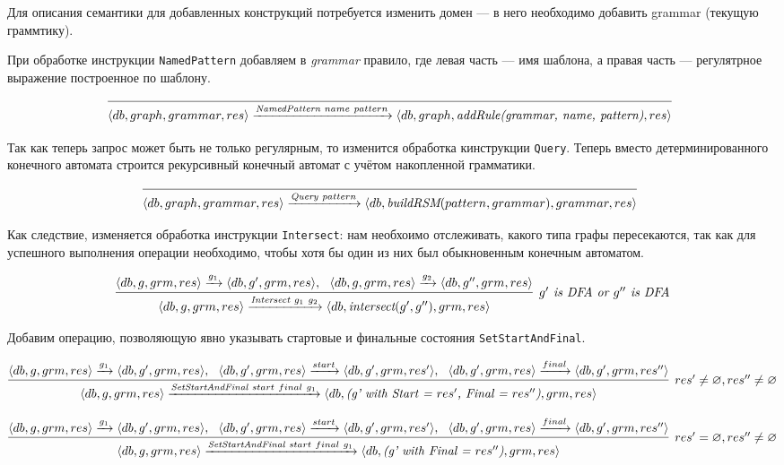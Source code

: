 Для описания семантики для добавленных конструкций потребуется изменить домен --- в него необходимо добавить grammar (текущую граммтику).


При обработке инструкции \verb|NamedPattern| добавляем в \textit{grammar} правило, где левая часть --- имя шаблона, а правая часть --- регулятрное выражение построенное по шаблону.

$$
\infer[]{\langle db, graph, grammar, res \rangle \xrightarrow{\textit{NamedPattern} \ name \ pattern} \langle db, graph, \textit{addRule(grammar, name, pattern)}, res \rangle}{}
$$

Так как теперь запрос может быть не только регулярным, то изменится обработка кинструкции \verb|Query|. Теперь вместо детерминированного конечного автомата строится рекурсивный конечный автомат с учётом накопленной грамматики.

$$
\infer[]{\langle db, graph, grammar, res \rangle \xrightarrow{\textit{Query} \ pattern} \langle db, \textit{buildRSM}(pattern, grammar), grammar, res \rangle}{}
$$

Как следствие, изменяется обработка инструкции \verb|Intersect|: нам необхоимо отслеживать, какого типа графы пересекаются, так как для успешного выполнения операции необходимо, чтобы хотя бы один из них был обыкновенным конечным автоматом.

$$
\infer[\textit {$g'$ is DFA or $g''$ is DFA}]{\langle db, g, grm, res\rangle \xrightarrow{\textit{Intersect} \ g_1 \ g_2} \langle db, \textit{intersect}(g', g''), grm, res\rangle}{\langle db, g, grm, res\rangle \xrightarrow{g_1} \langle db, g', grm, res \rangle, \ \ \langle db, g, grm, res \rangle \xrightarrow{g_2} \langle db, g'', grm, res \rangle}
$$

Добавим операцию, позволяющую явно указывать стартовые и финальные состояния \verb|SetStartAndFinal|.

{
\scriptsize
$$
\infer[res' \neq \varnothing, res'' \neq \varnothing]{\langle db, g, grm, res\rangle \xrightarrow{\textit{SetStartAndFinal} \ start \ final \ g_1} \langle db, \textit{(g' with Start = $res'$, Final = $res''$)}, grm, res\rangle}{\langle db, g, grm, res\rangle \xrightarrow{g_1} \langle db, g', grm, res \rangle, \ \ \langle db, g', grm, res \rangle \xrightarrow{start} \langle db, g', grm, res' \rangle, \ \ \langle db, g', grm, res \rangle \xrightarrow{final} \langle db, g', grm, res'' \rangle}
$$
}

{
\scriptsize
$$
\infer[res' = \varnothing, res'' \neq \varnothing]{\langle db, g, grm, res\rangle \xrightarrow{\textit{SetStartAndFinal} \ start \ final \ g_1} \langle db, \textit{(g' with Final = $res''$)}, grm, res\rangle}{\langle db, g, grm, res\rangle \xrightarrow{g_1} \langle db, g', grm, res \rangle, \ \ \langle db, g', grm, res \rangle \xrightarrow{start} \langle db, g', grm, res' \rangle, \ \ \langle db, g', grm, res \rangle \xrightarrow{final} \langle db, g', grm, res'' \rangle}
$$
}

